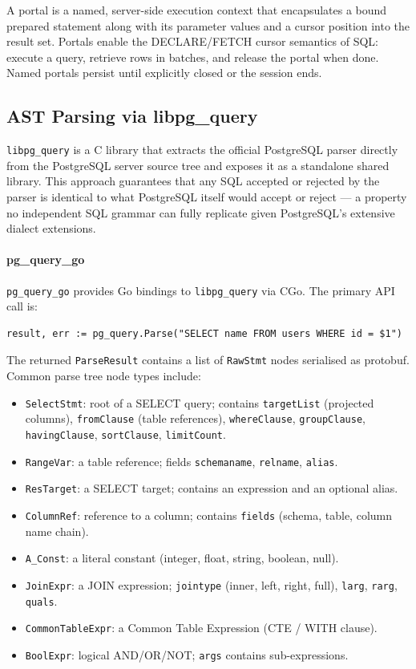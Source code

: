 A portal is a named, server-side execution context that encapsulates a bound prepared statement along with its parameter values and a cursor position into the result set. Portals enable the DECLARE/FETCH cursor semantics of SQL: execute a query, retrieve rows in batches, and release the portal when done. Named portals persist until explicitly closed or the session ends.

\subsection{AST Parsing via libpg\_query}

\texttt{libpg\_query} is a C library that extracts the official PostgreSQL parser directly from the PostgreSQL server source tree and exposes it as a standalone shared library. This approach guarantees that any SQL accepted or rejected by the parser is identical to what PostgreSQL itself would accept or reject — a property no independent SQL grammar can fully replicate given PostgreSQL's extensive dialect extensions.

\paragraph{pg\_query\_go}

\texttt{pg\_query\_go} provides Go bindings to \texttt{libpg\_query} via CGo. The primary API call is:

\begin{verbatim}
result, err := pg_query.Parse("SELECT name FROM users WHERE id = $1")
\end{verbatim}

The returned \texttt{ParseResult} contains a list of \texttt{RawStmt} nodes serialised as protobuf. Common parse tree node types include:
\begin{itemize}
    \item \texttt{SelectStmt}: root of a SELECT query; contains \texttt{targetList} (projected columns), \texttt{fromClause} (table references), \texttt{whereClause}, \texttt{groupClause}, \texttt{havingClause}, \texttt{sortClause}, \texttt{limitCount}.
    \item \texttt{RangeVar}: a table reference; fields \texttt{schemaname}, \texttt{relname}, \texttt{alias}.
    \item \texttt{ResTarget}: a SELECT target; contains an expression and an optional alias.
    \item \texttt{ColumnRef}: reference to a column; contains \texttt{fields} (schema, table, column name chain).
    \item \texttt{A\_Const}: a literal constant (integer, float, string, boolean, null).
    \item \texttt{JoinExpr}: a JOIN expression; \texttt{jointype} (inner, left, right, full), \texttt{larg}, \texttt{rarg}, \texttt{quals}.
    \item \texttt{CommonTableExpr}: a Common Table Expression (CTE / WITH clause).
    \item \texttt{BoolExpr}: logical AND/OR/NOT; \texttt{args} contains sub-expressions.
\end{itemize}

